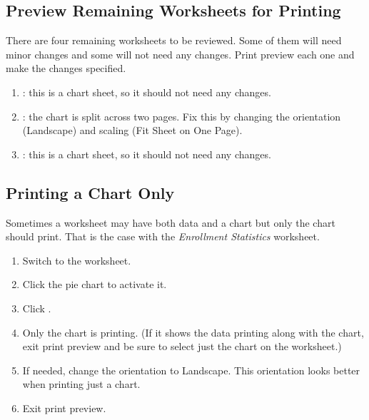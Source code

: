 \subsection{Preview Remaining Worksheets for Printing}

There are four remaining worksheets to be reviewed. Some of them will need minor changes and some will not need any changes. Print preview each one and make the changes specified.

\begin{enumbox}
	\begin{enumerate}
		\item {}: this is a chart sheet, so it should not need any changes.
		\item {}: the chart is split across two pages. Fix this by changing the orientation (Landscape) and scaling (Fit Sheet on One Page).
		\item {}: this is a chart sheet, so it should not need any changes.
	\end{enumerate}
\end{enumbox}

\subsection{Printing a Chart Only}

Sometimes a worksheet may have both data and a chart but only the chart should print. That is the case with the \textit{Enrollment Statistics} worksheet.

\begin{enumbox}
	\begin{enumerate}
		\item Switch to the  worksheet.
		\item Click the pie chart to activate it.
		\item Click .
		\item Only the chart is printing. (If it shows the data printing along with the chart, exit print preview and be sure to select just the chart on the worksheet.)
		\item If needed, change the orientation to Landscape. This orientation looks better when printing just a chart.
		\item Exit print preview.
	\end{enumerate}
\end{enumbox}
	
